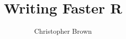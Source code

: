 

\usepackage{amsmath}
\usepackage{siunitx}

\title{Writing Faster R}
\author{
	Christopher Brown
}
\date{}



\begin{frame}
	\titlepage
\end{frame}
\note{
	
}


